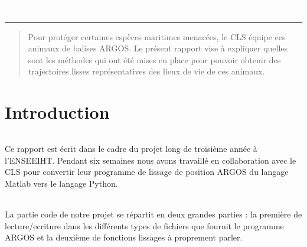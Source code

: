 \documentclass[11p, a4papert]{article}
\author{%
    Anthony Delannoy \\
    \texttt{anthony.delannoy@etu.enseeiht.fr}\vspace{40pt} \\
    Benoit Madiot \\
    \texttt{benoit.madiot@etu.enseeiht.fr}\vspace{40pt} \\
    Jérôme Combaniere \\
    \texttt{jerome.combaniere@etu.enseeiht.fr} 
    }
\makeatletter
\def\printauthor{%
    {\large \@author}}
\makeatother
\begin{document}
\begin{titlepage}
\BgThispage
{}
\vspace*{0.4\textheight}
\noindent
\textcolor{white}{\huge\textbf{\textsf{Méthode de lissage appliquées aux trajectoires ARGOS}}}
\vspace*{3cm}\par
\noindent
\begin{minipage}{0.5\linewidth}
    \begin{flushright}
        \printauthor
    \end{flushright}
\end{minipage} \hspace{15pt}
%
\begin{minipage}{0.02\linewidth}
    \rule{1pt}{175pt}
\end{minipage} \hspace{-10pt}
%
\begin{minipage}{0.63\linewidth}
\vspace{5pt}
    \begin{abstract} 
        Pour protéger certaines espèces maritimes menacées, le CLS équipe ces animaux de balises ARGOS. Le présent rapport vise à expliquer quelles sont les méthodes qui ont été mises en place pour pouvoir obtenir des trajectoires lisses représentatives des lieux de vie de ces animaux.
    \end{abstract}
\end{minipage}
\end{titlepage}
\restoregeometry

\newpage
\thispagestyle{empty}
\tableofcontents
\newpage


\part{Introduction}
\paragraph{}
 Ce rapport est écrit dans le cadre du projet long de troisième année à l'ENSEEIHT. Pendant six semaines nous avons travaillé en collaboration avec le CLS pour convertir leur programme de lissage de position ARGOS du langage Matlab vers le langage Python.
\paragraph{}
La partie code de notre projet se répartit en deux grandes parties : la première de lecture/ecriture dans les différents types de fichiers que fournit le programme ARGOS et la deuxième de fonctions lissages à proprement parler.
\end{document}
